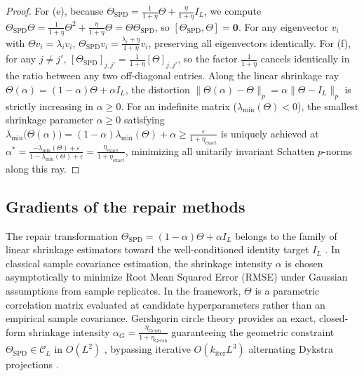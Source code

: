 \documentclass[default,sn-mathphys,Numbered]{sn-jnl}
\theoremstyle{thmstyleone}
\theoremstyle{thmstylethree}
\theoremstyle{thmstyletwo}
\begin{document}
\begin{proof}
For (e), because $\Theta_{\mathrm{SPD}} = \frac{1}{1+\eta}\Theta + \frac{\eta}{1+\eta}I_L$, we compute $\Theta_{\mathrm{SPD}} \Theta = \frac{1}{1+\eta}\Theta^2 + \frac{\eta}{1+\eta}\Theta = \Theta \Theta_{\mathrm{SPD}}$, so $[\Theta_{\mathrm{SPD}}, \Theta] = \bm{0}$. For any eigenvector $v_i$ with $\Theta v_i = \lambda_i v_i$, $\Theta_{\mathrm{SPD}} v_i = \frac{\lambda_i + \eta}{1+\eta} v_i$, preserving all eigenvectors identically.
For (f), for any $j \neq j'$, $[\Theta_{\mathrm{SPD}}]_{j, j'} = \frac{1}{1+\eta}[\Theta]_{j, j'}$, so the factor $\frac{1}{1+\eta}$ cancels identically in the ratio between any two off-diagonal entries. Along the linear shrinkage ray $\Theta(\alpha) = (1-\alpha)\Theta + \alpha I_L$, the distortion $\|\Theta(\alpha) - \Theta\|_p = \alpha \|\Theta - I_L\|_p$ is strictly increasing in $\alpha \ge 0$. For an indefinite matrix ($\lambda_{\min}(\Theta) < 0$), the smallest shrinkage parameter $\alpha \ge 0$ satisfying $\lambda_{\min}\bigl(\Theta(\alpha)\bigr) = (1-\alpha)\lambda_{\min}(\Theta) + \alpha \ge \frac{\varepsilon}{1+\eta_{\mathrm{exact}}}$ is uniquely achieved at $\alpha^* = \frac{-\lambda_{\min}(\Theta) + \varepsilon}{1 - \lambda_{\min}(\Theta) + \varepsilon} = \frac{\eta_{\mathrm{exact}}}{1+\eta_{\mathrm{exact}}}$, minimizing all unitarily invariant Schatten $p$-norms along this ray.
\end{proof}

\subsection{Gradients of the repair methods}
The repair transformation $\Theta_{\mathrm{SPD}} = (1-\alpha)\Theta + \alpha I_L$ belongs to the family of linear shrinkage estimators toward the well-conditioned identity target $I_L$ \citep{ledoit2004well,schafer2005shrinkage}. In classical sample covariance estimation, the shrinkage intensity $\alpha$ is chosen asymptotically to minimize Root Mean Squared Error (RMSE) under Gaussian assumptions from sample replicates. In the framework, $\Theta$ is a parametric correlation matrix evaluated at candidate hyperparameters rather than an empirical sample covariance. Gershgorin circle theory provides an exact, closed-form shrinkage intensity $\alpha_G = \frac{\eta_{\mathrm{Gersh}}}{1 + \eta_{\mathrm{Gersh}}}$ guaranteeing the geometric constraint $\Theta_{\mathrm{SPD}} \in \mathcal{C}_L$ in $O(L^2)$ , bypassing iterative $O(k_{\mathrm{iter}} L^3)$ alternating Dykstra projections \citep{higham2002computing}.
\end{document}
